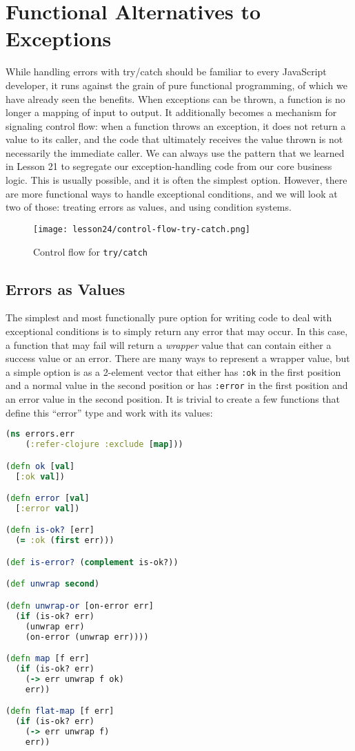 \documentclass[10pt,twoside,openright]{memoir}
\begin{document}
\section{Functional Alternatives to Exceptions}

While handling errors with try/catch should be familiar to every
JavaScript developer, it runs against the grain of pure functional
programming, of which we have already seen the benefits. When exceptions
can be thrown, a function is no longer a mapping of input to output. It
additionally becomes a mechanism for signaling control flow: when a
function throws an exception, it does not return a value to its caller,
and the code that ultimately receives the value thrown is not
necessarily the immediate caller. We can always use the pattern that we
learned in Lesson 21 to segregate our exception-handling code from our core business
logic. This is usually possible, and it is often the simplest option.
However, there are more functional ways to handle exceptional
conditions, and we will look at two of those: treating errors as values,
and using condition systems.

\begin{figure}[H]
\caption{Control flow for \texttt{try/catch}}
\centering
\texttt{[image: lesson24/control-flow-try-catch.png]}
\end{figure}

\subsection{Errors as Values}

The simplest and most functionally pure option for writing code to deal
with exceptional conditions is to simply return any error that may
occur. In this case, a function that may fail will return a
\emph{wrapper} value that can contain either a success value or an
error. There are many ways to represent a wrapper value, but a simple
option is as a 2-element vector that either has \texttt{:ok} in the
first position and a normal value in the second position or has
\texttt{:error} in the first position and an error value in the second
position. It is trivial to create a few functions that define this
``error'' type and work with its values:

\begin{lstlisting}[language=Clojure, caption={Defining an error type}]
(ns errors.err
    (:refer-clojure :exclude [map]))

(defn ok [val]
  [:ok val])

(defn error [val]
  [:error val])

(defn is-ok? [err]
  (= :ok (first err)))

(def is-error? (complement is-ok?))

(def unwrap second)

(defn unwrap-or [on-error err]
  (if (is-ok? err)
    (unwrap err)
    (on-error (unwrap err))))

(defn map [f err]
  (if (is-ok? err)
    (-> err unwrap f ok)
    err))

(defn flat-map [f err]
  (if (is-ok? err)
    (-> err unwrap f)
    err))
\end{lstlisting}
\end{document}

